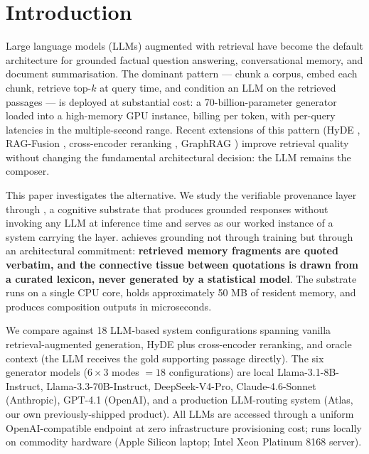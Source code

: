 \section{Introduction}
\label{sec:intro}

Large language models (LLMs) augmented with retrieval have become
the default architecture for grounded factual question answering,
conversational memory, and document summarisation. The dominant
pattern --- chunk a corpus, embed each chunk, retrieve top-$k$ at
query time, and condition an LLM on the retrieved passages --- is
deployed at substantial cost: a 70-billion-parameter generator
loaded into a high-memory GPU instance, billing per token, with
per-query latencies in the multiple-second range. Recent extensions
of this pattern (HyDE
\citep{gao2022hyde}, RAG-Fusion \citep{rackauckas2024ragfusion},
cross-encoder reranking \citep{nogueira2019passage,
reimers2019sentencebert}, GraphRAG
\citep{edge2024graphrag}) improve retrieval quality without changing
the fundamental architectural decision: the LLM remains the
composer.

This paper investigates the alternative. We study the verifiable
provenance layer through \hyphae{}, a cognitive substrate that
produces grounded responses without invoking any LLM at inference
time and serves as our worked instance of a system carrying the
layer. \hyphae{} achieves grounding not through training but
through an architectural commitment:
\textbf{retrieved memory fragments are quoted verbatim, and the
connective tissue between quotations is drawn from a curated
lexicon, never generated by a statistical model}. The substrate
runs on a single CPU core, holds approximately 50 MB of resident
memory, and produces composition outputs in microseconds.

We compare \hyphae{} against 18 LLM-based system configurations
spanning vanilla retrieval-augmented generation, HyDE plus
cross-encoder reranking, and oracle context (the LLM receives
the gold supporting passage directly). The six generator models
($6\times3$ modes $= 18$ configurations) are local
Llama-3.1-8B-Instruct, Llama-3.3-70B-Instruct, DeepSeek-V4-Pro,
Claude-4.6-Sonnet (Anthropic), GPT-4.1 (OpenAI), and a production
LLM-routing system (Atlas, our own previously-shipped product).
All LLMs are accessed through a uniform OpenAI-compatible
endpoint at zero infrastructure provisioning cost; \hyphae{}
runs locally on commodity hardware (Apple Silicon laptop;
Intel Xeon Platinum 8168 server).

